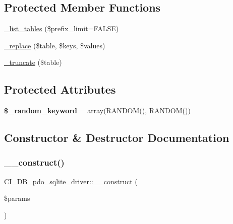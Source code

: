 \subsection*{Protected Member Functions}
\begin{DoxyCompactItemize}
\item 
\mbox{\hyperlink{class_c_i___d_b__pdo__sqlite__driver_ae1ffa509973054db50f18010e81ee3de}{\+\_\+list\+\_\+tables}} (\$prefix\+\_\+limit=F\+A\+L\+SE)
\item 
\mbox{\hyperlink{class_c_i___d_b__pdo__sqlite__driver_ac066761e4ff5833db71c4384a59270c4}{\+\_\+replace}} (\$table, \$keys, \$values)
\item 
\mbox{\hyperlink{class_c_i___d_b__pdo__sqlite__driver_a0a390488e5dd90d6ac6c7f2b5fc7c563}{\+\_\+truncate}} (\$table)
\end{DoxyCompactItemize}
\subsection*{Protected Attributes}
\begin{DoxyCompactItemize}
\item 
\mbox{\label{class_c_i___d_b__pdo__sqlite__driver_ae7556edf3c42ff0823e219c34e6c36fd}} 
{\bfseries \$\+\_\+random\+\_\+keyword} = array(\textquotesingle{}R\+A\+N\+D\+OM()\textquotesingle{}, \textquotesingle{}R\+A\+N\+D\+OM()\textquotesingle{})
\end{DoxyCompactItemize}


\subsection{Constructor \& Destructor Documentation}
\mbox{\label{class_c_i___d_b__pdo__sqlite__driver_a254cd46bb6292de58347ae2d36dd69d5}} 
\subsubsection{\texorpdfstring{\+\_\+\+\_\+construct()}{\_\_construct()}}
{\footnotesize\ttfamily C\+I\+\_\+\+D\+B\+\_\+pdo\+\_\+sqlite\+\_\+driver\+::\+\_\+\+\_\+construct (\begin{DoxyParamCaption}\item[{}]{\$params }\end{DoxyParamCaption})}

